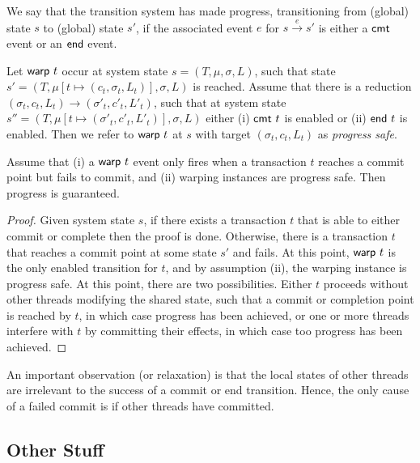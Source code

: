 \begin{definition}[Progress]
	We say that the transition system has made progress, transitioning from (global) state $s$ to (global) state $s'$, if the associated event $e$ for
	$s \stackrel{e}{\longrightarrow} s'$ is either a ${\sf cmt}$ event or an ${\sf end}$ event.
\end{definition}

\begin{definition}
	Let ${\sf warp}\ t$ occur at system state $s=(T,\mu,\sigma,L)$, such that state $s'=(T,\mu[t \mapsto (c_t,\sigma_t,L_t)],\sigma,L)$ is reached. Assume that there is a reduction
	$(\sigma_t,c_t,L_t) {\longrightarrow} (\sigma'_t,c'_t,L'_t)$, such that 
	at system state $s''=(T,\mu[t \mapsto (\sigma'_t,c'_t,L'_t)],\sigma,L)$ either (i)  ${\sf cmt}\ t$ is enabled or (ii) ${\sf end}\ t$ is enabled. Then we refer to ${\sf warp}\ t$ at $s$ with target $(\sigma_t,c_t,L_t)$ as \emph{progress safe}.
\end{definition}

\begin{theorem}[Progress] Assume that (i) a ${\sf warp}\ t$ event only fires when a transaction $t$ reaches a commit point but fails to commit, and (ii) warping instances are progress safe. Then progress is guaranteed.
	\begin{proof}
	Given system state $s$, if there exists a transaction $t$ that is able to either commit or complete then the proof is done. Otherwise, there is a transaction $t$ that reaches a commit point at some state $s'$ and fails. At this point, ${\sf warp}\ t$ is the only enabled transition for $t$, and by assumption (ii), the warping instance is progress safe. At this point, there are two possibilities. Either $t$ proceeds without other threads modifying the shared state, such that a commit or completion point is reached by $t$, in which case progress has been achieved, or one or more threads interfere with $t$ by committing their effects, in which case too progress has been achieved.
	\end{proof}
\end{theorem}

An important observation (or relaxation) is that the local states of other threads are irrelevant to the success of a commit or end transition. Hence, the only cause of a failed commit is if other threads have committed.

\subsection{Other Stuff}

